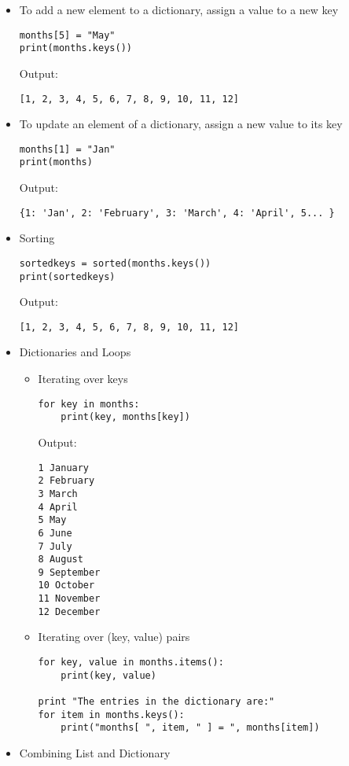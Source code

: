 \documentclass{article}
\begin{document}
\begin{itemize}
\item To add a new element to a dictionary, assign a value to a new key

	\begin{verbatim}
months[5] = "May"
print(months.keys())
	\end{verbatim}
Output:
	\begin{verbatim}
[1, 2, 3, 4, 5, 6, 7, 8, 9, 10, 11, 12]
	\end{verbatim}

\item To update an element of a dictionary, assign a new value to its key
	\begin{verbatim}
months[1] = "Jan"
print(months)
	\end{verbatim}
Output:
	\begin{verbatim}
{1: 'Jan', 2: 'February', 3: 'March', 4: 'April', 5... }
	\end{verbatim}

\item Sorting

	\begin{verbatim}
sortedkeys = sorted(months.keys())
print(sortedkeys)
	\end{verbatim}
Output:
	\begin{verbatim}
[1, 2, 3, 4, 5, 6, 7, 8, 9, 10, 11, 12]
	\end{verbatim}

\item Dictionaries and Loops
	\begin{itemize}
	\item Iterating over keys
	\begin{verbatim}
for key in months:
    print(key, months[key])
	\end{verbatim}
Output:
	\begin{verbatim}
1 January
2 February
3 March
4 April
5 May
6 June
7 July
8 August
9 September
10 October
11 November
12 December
	\end{verbatim}
	\item Iterating over (key, value) pairs
	\begin{verbatim}
for key, value in months.items():
    print(key, value)

print "The entries in the dictionary are:"
for item in months.keys():
    print("months[ ", item, " ] = ", months[item])
	\end{verbatim}
	\end{itemize}
\item Combining List and Dictionary


\end{itemize}
\end{document}
